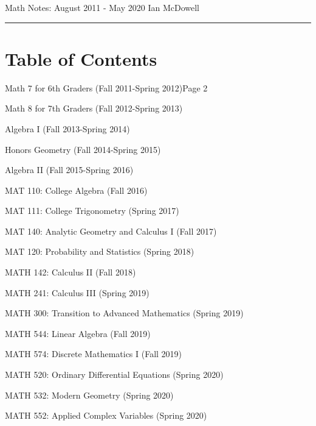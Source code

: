\documentclass{article}
\begin{document}
 	\noindent\Large{Math Notes: August 2011 - May 2020 \hfill Ian McDowell}
	\noindent\hrule

	\section*{Table of Contents}
	\begin{enumerate*}
		\item Math 7 for 6th Graders (Fall 2011-Spring 2012)\hfill Page 2
		\item Math 8 for 7th Graders (Fall 2012-Spring 2013)
		\item Algebra I (Fall 2013-Spring 2014)
		\item Honors Geometry (Fall 2014-Spring 2015)
		\item Algebra II (Fall 2015-Spring 2016)
		\item MAT 110: College Algebra (Fall 2016)
		\item MAT 111: College Trigonometry (Spring 2017)
		\item MAT 140: Analytic Geometry and Calculus I (Fall 2017)
		\item MAT 120: Probability and Statistics (Spring 2018)
		\item MATH 142: Calculus II (Fall 2018)
		\item MATH 241: Calculus III (Spring 2019)
		\item MATH 300: Transition to Advanced Mathematics (Spring 2019)
		\item MATH 544: Linear Algebra (Fall 2019)
		\item MATH 574: Discrete Mathematics I (Fall 2019)
		\item MATH 520: Ordinary Differential Equations (Spring 2020)
		\item MATH 532: Modern Geometry (Spring 2020)
		\item MATH 552: Applied Complex Variables (Spring 2020)
	\end{enumerate*}

	
\end{document}
